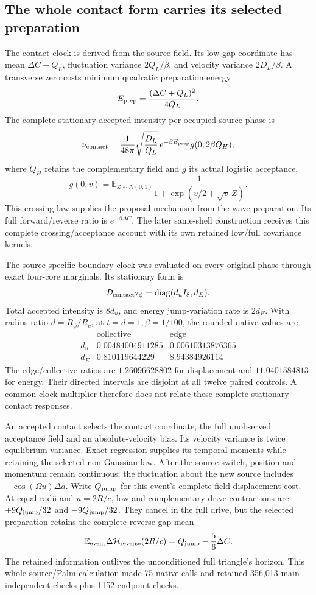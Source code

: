 \subsection{The whole contact form carries its selected preparation}

The contact clock is derived from the source field. Its low-gap coordinate
has mean \(\Delta C+Q_L\), fluctuation variance \(2Q_L/\beta\), and
velocity variance \(2D_L/\beta\). A transverse zero costs minimum quadratic
preparation energy
\[
 E_{\rm prep}=\frac{(\Delta C+Q_L)^2}{4Q_L}.
\]
The complete stationary accepted intensity per occupied source phase is
\[
 \nu_{\rm contact}
 =\frac1{48\pi}\sqrt{\frac{D_L}{Q_L}}\,
 e^{-\beta E_{\rm prep}}g(0,2\beta Q_H),
\]
where \(Q_H\) retains the complementary field and \(g\) its actual logistic
acceptance,
\[
 g(0,v)=\mathbb E_{Z\sim N(0,1)}
       \frac1{1+\exp(v/2+\sqrt v\,Z)}.
\]
This crossing law supplies the proposal mechanism from the
wave preparation. Its full forward/reverse ratio is
\(e^{-\beta\Delta C}\). The later same-shell construction receives this
complete crossing/acceptance account with its own retained low/full
covariance kernels.

The source-specific boundary clock was evaluated on every original phase
through exact four-core marginals. Its stationary form is
\[
 {\cal D}_{\rm contact}\tau_\phi
      =\operatorname{diag}(d_uI_8,d_E).
\]
Total accepted intensity is \(8d_u\), and energy jump-variation rate is
\(2d_E\). With radius ratio \(d=R_\phi/R_c\), at
\(t=d=1,\beta=1/100\), the rounded native values are
\[
\begin{array}{c|rr}
 &\text{collective}&\text{edge}\\
\hline
d_u&0.00484004911285&0.00610313876365\\
d_E&0.810119644229&8.94384926114
\end{array}
\]
The edge/collective ratios are \(1.26096628802\) for displacement and
\(11.0401584813\) for energy. Their directed intervals are disjoint at
all twelve paired controls. A common clock multiplier therefore does not
relate these complete stationary contact responses.

An accepted contact selects the contact coordinate, the full unobserved
acceptance field and an absolute-velocity bias. Its velocity variance is
twice equilibrium variance. Exact regression supplies its temporal
moments while retaining the selected non-Gaussian law. After the source
switch, position and momentum remain continuous; the fluctuation about
the new source includes \(-\cos(\Omega u)\Delta a\). Write \(Q_{\rm jump}\)
for this event's complete field displacement cost. At equal radii and
\(u=2R/c\), low and complementary drive contractions are
\(+9Q_{\rm jump}/32\) and \(-9Q_{\rm jump}/32\).
They cancel in the full drive, but the selected
preparation retains the complete reverse-gap mean
\[
 \mathbb E_{\rm event}\Delta{\cal H}_{\rm reverse}(2R/c)
       =Q_{\rm jump}-\frac56\Delta C.
\]
The retained information outlives the unconditioned full triangle's
horizon. This whole-source/Palm calculation made 75 native calls and
retained 356,013 main independent checks plus 1152 endpoint checks.

